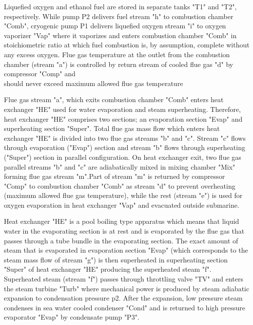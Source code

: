 \documentclass[openany]{book}
\begin{document}
	Liquefied oxygen and ethanol fuel are stored in separate tanks "T1" and 
	"T2", respectively. While pump P2 delivers fuel stream "h" to combustion 
	chamber "Comb", cryogenic pump P1 delivers liquefied oxygen stream "i" to 
	oxygen vaporizer "Vap" where it vaporizes and enters combustion chamber 
	"Comb" in stoichiometric ratio at which fuel combustion is, by assumption, 
	complete without any excess oxygen. Flue gas temperature at the outlet from 
	the combustion chamber (stream "a") is controlled by return stream of 
	cooled flue gas "d" by compressor "Comp" and\\
	should never exceed maximum allowed flue gas temperature %
	
	Flue gas stream "a", which exits combustion chamber "Comb" enters heat 
	exchanger "HE" used for water evaporation and steam superheating. 
	Therefore, heat exchanger "HE" comprises two sections; an evaporation 
	section "Evap" and superheating section "Super". Total 
	flue gas mass flow which enters heat exchanger "HE" is divided into two 
	flue gas streams "b" and "c". Stream "c" flows through evaporation ("Evap") 
	section and stream "b" flows through superheating ("Super") section in 
	parallel configuration. On heat exchanger exit, two flue gas parallel 
	streams "b" and "c" are adiabatically mixed in mixing chamber "Mix" forming 
	flue gas stream "m".Part of stream "m" is returned by compressor "Comp" to 
	combustion chamber "Comb" as stream "d" to prevent overheating (maximum 
	allowed flue gas temperature), while the rest (stream "e") is used for 
	oxygen evaporation in heat exchanger "Vap" and evacuated outside submarine.
	
	Heat exchanger "HE" is a pool boiling type apparatus which means that 
	liquid water in the evaporating section is at rest and is evaporated by the 
	flue gas that passes through a tube bundle in the evaporating section. The 
	exact amount of steam that is evaporated in evaporation section "Evap" 
	(which corresponds to the steam mass flow of stream "g") is then 
	superheated in superheating section "Super" of heat exchanger "HE" 
	producing the superheated steam "f". Superheated steam (stream "f") passes 
	through throttling valve "TV" and enters the steam turbine "Turb" where 
	mechanical power is produced by steam adiabatic expansion to condensation 
	pressure p2. After the expansion, low pressure steam condenses in sea water 
	cooled condenser "Cond" and is returned to high pressure evaporator "Evap" 
	by condensate pump "P3". 
	
\end{document}
